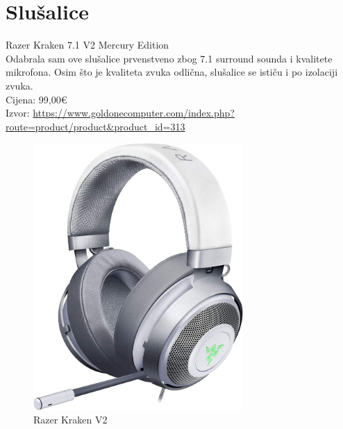 \documentclass{report}
\begin{document}
\chapter{Slušalice}
Razer Kraken 7.1 V2 Mercury Edition
\\Odabrala sam ove slušalice prvenstveno zbog 7.1 surround sounda i kvalitete mikrofona. Osim što je kvaliteta zvuka odlična, slušalice se ističu i po izolaciji zvuka.
\\Cijena: 99,00€
\\Izvor:  \url{https://www.goldonecomputer.com/index.php?route=product/product&product_id=313}
\begin{figure}[h]
\includegraphics[width=8cm]{slusalice.jpg}
\caption{Razer Kraken V2}
\end{figure}
\end{document}
